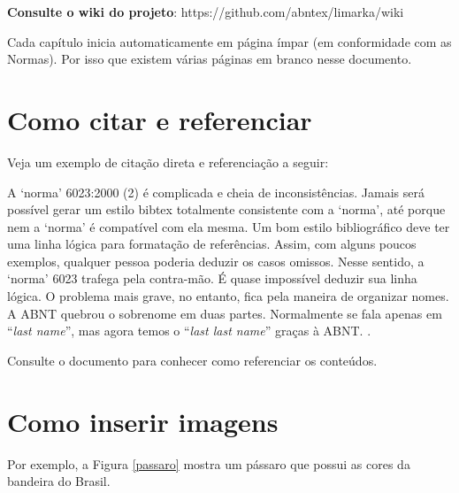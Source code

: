 \documentclass[
	12pt,				%
	oneside,			%
	a4paper,			%
	english,			%
	french,				%
	spanish,			%
	brazil				%
	]{abntex2}
\renewenvironment{quote}
  {\small\list{}{\rightmargin=0.1cm \leftmargin=4cm}%
   \item\relax}
  {\endlist}
\begin{document}
\textbf{Consulte o wiki do projeto}:
https://github.com/abntex/limarka/wiki

Cada capítulo inicia automaticamente em página ímpar (em conformidade
com as Normas). Por isso que existem várias páginas em branco nesse
documento.

\hypertarget{como-citar-e-referenciar}{%
\section{Como citar e referenciar}\label{como-citar-e-referenciar}}

Veja um exemplo de citação direta e referenciação a seguir:

\begin{quote}
A `norma' 6023:2000 (2) é complicada e cheia de inconsistências. Jamais
será possível gerar um estilo bibtex totalmente consistente com a
`norma', até porque nem a `norma' é compatível com ela mesma. Um bom
estilo bibliográfico deve ter uma linha lógica para formatação de
referências. Assim, com alguns poucos exemplos, qualquer pessoa poderia
deduzir os casos omissos. Nesse sentido, a `norma' 6023 trafega pela
contra-mão. É quase impossível deduzir sua linha lógica. O problema mais
grave, no entanto, fica pela maneira de organizar nomes. A ABNT quebrou
o sobrenome em duas partes. Normalmente se fala apenas em ``\emph{last
name}'', mas agora temos o ``\emph{last last name}'' graças à ABNT.
\cite[p. 5]{abntex2cite}.
\end{quote}

Consulte o documento  para conhecer como
referenciar os conteúdos.

\hypertarget{como-inserir-imagens}{%
\section{Como inserir imagens}\label{como-inserir-imagens}}

Por exemplo, a Figura \ref{passaro} mostra um pássaro que possui as
cores da bandeira do Brasil.
\end{document}
